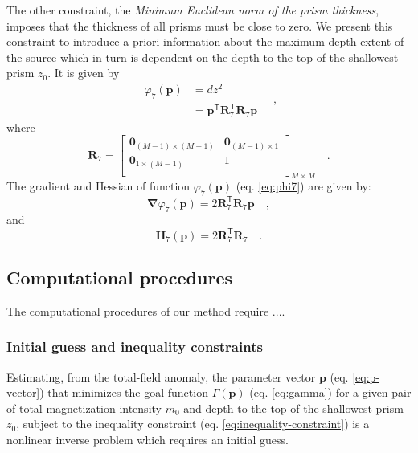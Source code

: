 The other constraint, the \textit{Minimum Euclidean norm of the prism thickness}, imposes that the thickness of all prisms must be close to zero. We present this constraint to introduce a priori information about the maximum depth extent of the source which in turn is dependent on the depth to the top of the shallowest prism $z_{0}$. It is given by
\begin{equation}\label{eq:phi7}
\begin{split}
\varphi_{7}(\mathbf{p}) &= dz^2 \\
&= \mathbf{p}^{\mathsf{T}} \mathbf{R}_{7}^{\mathsf{T}} \mathbf{R}_{7} \mathbf{p}
\end{split} \quad ,
\end{equation}
where
\begin{equation}
\mathbf{R}_{7} =
\begin{bmatrix}
\mathbf{0}_{(M-1) \times (M-1)} & \mathbf{0}_{(M-1) \times 1} \\
\mathbf{0}_{1 \times (M-1)} & 1 \\
\end{bmatrix}_{ M \times M } \quad .
\end{equation}
The gradient and Hessian of function $\varphi_{7}(\mathbf{p})$ (eq. \ref{eq:phi7}) are given by:
\begin{equation}\label{eq:phi7_grad}
\boldsymbol{\nabla}\varphi_{7}(\mathbf{p}) = 2 \mathbf{R}_{7}^{\mathsf{T}} \mathbf{R}_{7} \mathbf{p} \quad ,
\end{equation}
and
\begin{equation}\label{eq:phi7_hessian}
\mathbf{H}_{7}(\mathbf{p}) = 2 \mathbf{R}^{\mathsf{T}}_{7}\mathbf{R}_{7} \quad .
\end{equation}

\subsection{Computational procedures}

The computational procedures of our method require ....

\subsubsection{Initial guess and inequality constraints}

Estimating, from the total-field anomaly, the parameter vector $\mathbf{p}$ (eq. \ref{eq:p-vector}) that minimizes the goal function $\Gamma(\mathbf{p})$ (eq. \ref{eq:gamma}) 
for a given pair of total-magnetization intensity $m_{0}$ and depth to the top of the 
shallowest prism $z_{0}$, subject to the inequality constraint 
(eq. \ref{eq:inequality-constraint}) is a nonlinear inverse problem 
which requires an initial guess. 

